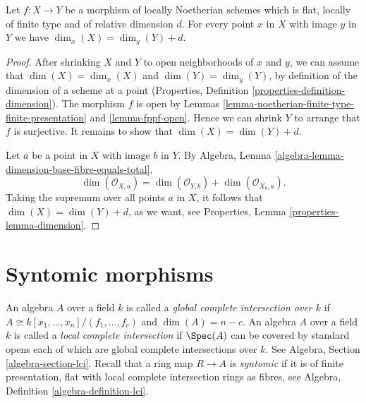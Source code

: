 \begin{lemma}
\label{lemma-rel-dimension-dimension}
Let $f : X \to Y$ be a morphism of locally Noetherian schemes
which is flat, locally of finite type and of relative dimension $d$.
For every point $x$ in $X$ with image
$y$ in $Y$ we have $\dim_x(X) = \dim_y(Y) + d$.
\end{lemma}

\begin{proof}
After shrinking $X$ and $Y$ to open neighborhoods of $x$ and $y$,
we can assume that $\dim(X) = \dim_x(X)$ and $\dim(Y) = \dim_y(Y)$,
by definition of the dimension of a scheme at a point
(Properties, Definition \ref{properties-definition-dimension}).
The morphism $f$ is open by Lemmas
\ref{lemma-noetherian-finite-type-finite-presentation} and
\ref{lemma-fppf-open}.
Hence we can shrink $Y$ to arrange that $f$ is surjective.
It remains to show that $\dim(X) = \dim(Y) + d$.

\medskip\noindent
Let $a$ be a point in $X$ with image $b$ in $Y$. By
Algebra, Lemma \ref{algebra-lemma-dimension-base-fibre-equals-total},
$$
\dim(\mathcal{O}_{X,a}) = \dim(\mathcal{O}_{Y,b}) + \dim(\mathcal{O}_{X_b, a}).
$$
Taking the supremum over all points $a$ in $X$, it follows
that $\dim(X) = \dim(Y) + d$, as we want, see
Properties, Lemma \ref{properties-lemma-dimension}.
\end{proof}











\section{Syntomic morphisms}
\label{section-syntomic}

\noindent
An algebra $A$ over a field $k$ is called a
{\it global complete intersection over $k$}
if $A \cong k[x_1, \ldots, x_n]/(f_1, \ldots, f_c)$ and
$\dim(A) = n - c$. An algebra $A$ over a field $k$ is called a
{\it local complete intersection} if $\Spec(A)$
can be covered by standard opens each of which are global
complete intersections over $k$. See Algebra, Section
\ref{algebra-section-lci}. Recall that a ring map $R \to A$
is {\it syntomic} if it is of finite presentation,
flat with local complete intersection rings as fibres,
see Algebra, Definition \ref{algebra-definition-lci}.

